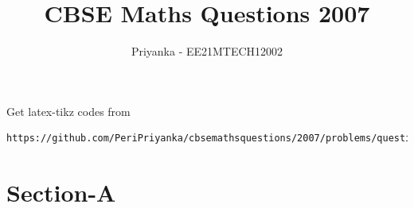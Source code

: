 \documentclass[journal,12pt,twocolumn]{IEEEtran}
\begin{document}
     \def\rightbox#1{\makebox[0in][r]{#1}}
     \def\centbox#1{\makebox[0in]{#1}}
     \def\topbox#1{\raisebox{-\baselineskip}[0in][0in]{#1}}
     \def\midbox#1{\raisebox{-0.5\baselineskip}[0in][0in]{#1}}
\vspace{3cm}
\title{CBSE Maths Questions 2007}
\author{Priyanka - EE21MTECH12002}
\maketitle
\newpage
\bigskip
\renewcommand{\thefigure}{\theenumi}
\renewcommand{\thetable}{\theenumi}
%
Get latex-tikz codes from 
%
\begin{lstlisting}
https://github.com/PeriPriyanka/cbsemathsquestions/2007/problems/questions
\end{lstlisting}
\section{Section-A}
\end{document}
